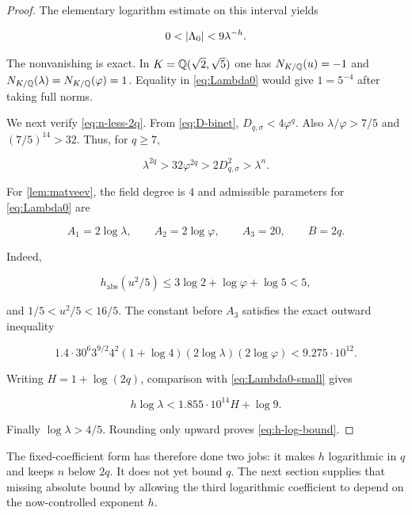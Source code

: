 \begin{proof}
The elementary logarithm estimate on this interval yields

\begin{equation}
 0<\lvert\Lambda_0\rvert<9\lambda^{-h}.
 \label{eq:Lambda0-small}
\end{equation}

The nonvanishing is exact. In
$K=\mathbb{Q}(\sqrt2,\sqrt5)$ one has
$N_{K/\mathbb{Q}}(u)=-1$ and
$N_{K/\mathbb{Q}}(\lambda)=N_{K/\mathbb{Q}}(\varphi)=1$. Equality in
\cref{eq:Lambda0} would give $1=5^{-4}$ after taking full norms.

We next verify \cref{eq:n-less-2q}. From \cref{eq:D-binet},
$D_{q,\sigma}<4\varphi^q$. Also $\lambda/\varphi>7/5$ and
$(7/5)^{14}>32$. Thus, for $q\geqslant7$,

\begin{equation}
 \lambda^{2q}>32\varphi^{2q}>2D_{q,\sigma}^2>\lambda^n.
\end{equation}

For \cref{lem:matveev}, the field degree is $4$ and admissible parameters
for \cref{eq:Lambda0} are

\begin{equation}
 A_1=2\log\lambda,
 \qquad
 A_2=2\log\varphi,
 \qquad
 A_3=20,
 \qquad
 B=2q.
\end{equation}

Indeed,

\begin{equation}
 h_{\mathrm{abs}}(u^2/5)
 \leqslant3\log2+\log\varphi+\log5<5,
\end{equation}

and $1/5<u^2/5<16/5$. The constant before $A_3$ satisfies the exact
outward inequality

\begin{equation}
 1.4\mathbin{\cdot}30^6 3^{9/2}4^2(1+\log4)
 (2\log\lambda)(2\log\varphi)
 <9.275\mathbin{\cdot}10^{12}.
 \label{eq:matveev-prefactor}
\end{equation}

Writing $H=1+\log(2q)$, comparison with
\cref{eq:Lambda0-small} gives

\begin{equation}
 h\log\lambda<1.855\mathbin{\cdot}10^{14}H+\log9.
\end{equation}

Finally $\log\lambda>4/5$. Rounding only upward proves
\cref{eq:h-log-bound}.
\end{proof}

The fixed-coefficient form has therefore done two jobs: it makes $h$
logarithmic in $q$ and keeps $n$ below $2q$. It does not yet bound $q$.
The next section supplies that missing absolute bound by allowing the third
logarithmic coefficient to depend on the now-controlled exponent $h$.
